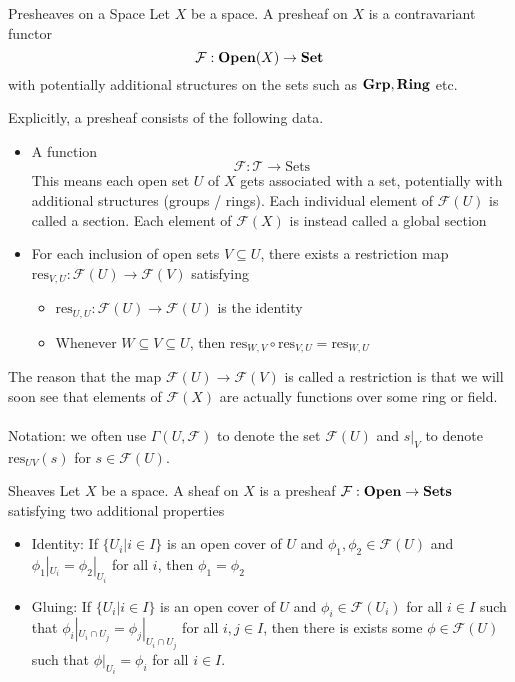 \documentclass[a4paper]{article}
\begin{document}
\begin{defn}{Presheaves on a Space}{} Let $X$ be a space. A presheaf on $X$ is a contravariant functor $$\mathcal{F}:\bold{Open}(X)\to\bold{Set}$$ with potentially additional structures on the sets such as $\bold{Grp},\bold{Ring}$ etc. 
\end{defn}

Explicitly, a presheaf consists of the following data. 

\begin{itemize}
\item A function $$\mathcal{F}:\mathcal{T}\to\text{Sets}$$ This means each open set $U$ of $X$ gets associated with a set, potentially with additional structures (groups / rings). Each individual element of $\mathcal{F}(U)$ is called a section. Each element of $\mathcal{F}(X)$ is instead called a global section
\item For each inclusion of open sets $V\subseteq U$, there exists a restriction map $\text{res}_{V,U}:\mathcal{F}(U)\to\mathcal{F}(V)$
 satisfying
\begin{itemize}
\item $\text{res}_{U,U}:\mathcal{F}(U)\to\mathcal{F}(U)$ is the identity
\item Whenever $W\subseteq V\subseteq U$, then $\text{res}_{W,V}\circ\text{res}_{V,U}=\text{res}_{W,U}$
\end{itemize}
\end{itemize}

The reason that the map $\mathcal{F}(U)\to\mathcal{F}(V)$ is called a restriction is that we will soon see that elements of $\mathcal{F}(X)$ are actually functions over some ring or field. \\~\\
Notation: we often use $\Gamma(U,\mathcal{F})$ to denote the set $\mathcal{F}(U)$ and $s|_V$ to denote $\text{res}_{UV}(s)$ for $s\in\mathcal{F}(U)$. 

\begin{defn}{Sheaves}{} Let $X$ be a space. A sheaf on $X$ is a presheaf $\mathcal{F}:\bold{Open}\to\bold{Sets}$ satisfying two additional properties
\begin{itemize}
\item Identity: If $\{U_i|i\in I\}$ is an open cover of $U$ and $\phi_1,\phi_2\in\mathcal{F}(U)$ and $\phi_1|_{U_i}=\phi_2|_{U_i}$ for all $i$, then $\phi_1=\phi_2$
\item Gluing: If $\{U_i|i\in I\}$ is an open cover of $U$ and $\phi_i\in\mathcal{F}(U_i)$ for all $i\in I$ such that $\phi_i|_{U_i\cap U_j}=\phi_j|_{U_i\cap U_j}$ for all $i,j\in I$, then there is exists some $\phi\in\mathcal{F}(U)$ such that $\phi|_{U_i}=\phi_i$ for all $i\in I$. 
\end{itemize}
\end{defn}
\end{document}
